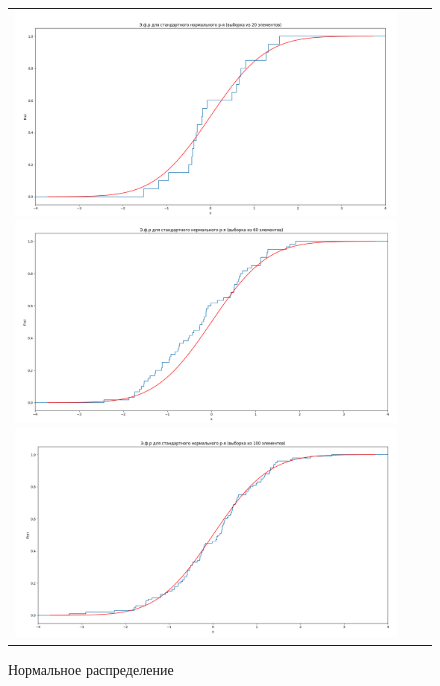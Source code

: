 \begin{figure}[H]
	\begin{tabular}{ccc}
		\includegraphics[scale=0.14]{resources/4_gauss_20.png}
		\includegraphics[scale=0.14]{resources/4_gauss_60.png}
		\includegraphics[scale=0.14]{resources/4_gauss_100.png}
	\end{tabular}
	\caption{Нормальное распределение}
\end{figure}

